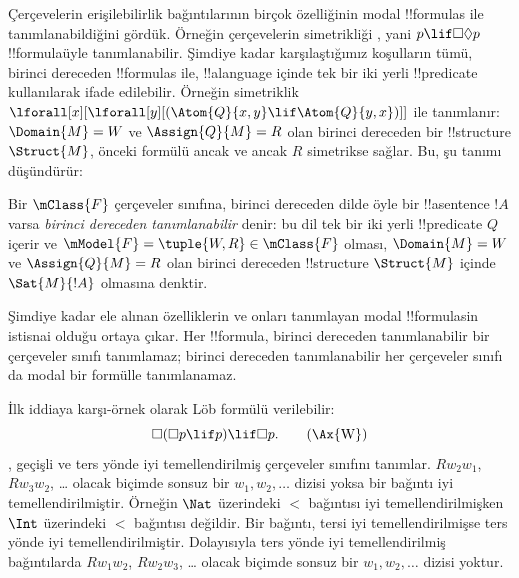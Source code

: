 



Çerçevelerin erişilebilirlik bağıntılarının birçok özelliğinin modal
!!{formula}s ile tanımlanabildiğini gördük. Örneğin çerçevelerin simetrikliği
, yani $p\lif\Box\Diamond p$ !!{formula}{}üyle tanımlanabilir. Şimdiye
kadar karşılaştığımız koşulların tümü, birinci dereceden !!{formula}s ile,
!!a{language} içinde tek bir iki yerli !!{predicate} kullanılarak ifade edilebilir.
Örneğin simetriklik $\lforall[x][\lforall[y][(\Atom{Q}{x,y}\lif
\Atom{Q}{y,x})]]$ ile tanımlanır: $\Domain{M}=W$ ve $\Assign{Q}{M}=R$
olan birinci dereceden bir !!{structure} $\Struct{M}$, önceki formülü ancak
ve ancak $R$ simetrikse sağlar. Bu, şu tanımı düşündürür:

\begin{defn}
  Bir $\mClass{F}$ çerçeveler sınıfına, birinci dereceden dilde öyle bir
  !!a{sentence} $!A$ varsa \emph{birinci dereceden tanımlanabilir} denir:
  bu dil tek bir iki yerli !!{predicate} $Q$ içerir ve
  $\mModel{F}=\tuple{W,R}\in\mClass{F}$ olması,
  $\Domain{M}=W$ ve $\Assign{Q}{M}=R$ olan birinci dereceden
  !!{structure} $\Struct{M}$ içinde $\Sat{M}{!A}$ olmasına denktir.
\end{defn}

Şimdiye kadar ele alınan özelliklerin ve onları tanımlayan modal
!!{formula}s{}in istisnai olduğu ortaya çıkar. Her !!{formula}, birinci
dereceden tanımlanabilir bir çerçeveler sınıfı tanımlamaz; birinci dereceden
tanımlanabilir her çerçeveler sınıfı da modal bir formülle tanımlanamaz.

İlk iddiaya karşı-örnek olarak L\"ob formülü verilebilir:
\begin{equation}
\Box(\Box p \lif p) \lif \Box p. \tag{\Ax{W}}
\end{equation}
, geçişli ve ters yönde iyi temellendirilmiş çerçeveler sınıfını
tanımlar. $Rw_2w_1$, $Rw_3w_2$, \dots{} olacak biçimde sonsuz bir
$w_1,w_2,\dots$ dizisi yoksa bir bağıntı iyi temellendirilmiştir. Örneğin
$\Nat$ üzerindeki $<$ bağıntısı iyi temellendirilmişken $\Int$ üzerindeki
$<$ bağıntısı değildir. Bir bağıntı, tersi iyi temellendirilmişse ters yönde
iyi temellendirilmiştir. Dolayısıyla ters yönde iyi temellendirilmiş
bağıntılarda $Rw_1w_2$, $Rw_2w_3$, \dots{} olacak biçimde sonsuz bir
$w_1,w_2,\dots$ dizisi yoktur.

